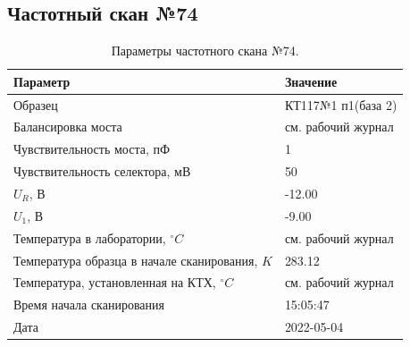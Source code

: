 \subsection{Частотный скан №74}
\begin{table}[!ht]
    \centering
    \caption{Параметры частотного скана №74.}
    \begin{tabular}{|l|l|}
        \hline
        Параметр                                       & Значение                  \\ \hline
        Образец                                        & КТ117№1 п1(база 2)        \\ \hline
        Балансировка моста                             & см. рабочий журнал        \\ \hline
        Чувствительность моста, пФ                     & 1                         \\ \hline
        Чувствительность селектора, мВ                 & 50                        \\ \hline
        $U_R$, В                                       & -12.00                    \\ \hline
        $U_1$, В                                       & -9.00                     \\ \hline
        Температура в лаборатории, $^\circ C$          & см. рабочий журнал        \\ \hline
        Температура образца в начале сканирования, $K$ & 283.12                    \\ \hline
        Температура, установленная на КТХ, $^\circ C$  & см. рабочий журнал        \\ \hline
        Время начала сканирования                      & 15:05:47                  \\ \hline
        Дата                                           & 2022-05-04                \\ \hline
    \end{tabular}
    \label{table:frequency_scan_74}
\end{table}

